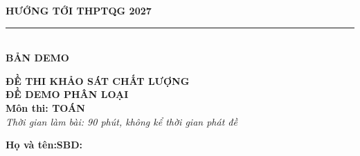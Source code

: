 \documentclass[12pt,a4paper]{article}
\begin{document}
\begin{minipage}[t]{0.40\textwidth}\centering
\textbf{HƯỚNG TỚI THPTQG 2027}\\[-2pt]
\rule{3.2cm}{0.6pt}\\[4pt]\textbf{BẢN DEMO}
\end{minipage}\hfill
\begin{minipage}[t]{0.58\textwidth}\centering
\textbf{ĐỀ THI KHẢO SÁT CHẤT LƯỢNG}\\
\textbf{ĐỀ DEMO PHÂN LOẠI}\\\textbf{Môn thi: TOÁN}\\
\textit{\small Thời gian làm bài: 90 phút, không kể thời gian phát đề}
\end{minipage}
\vspace{0.2cm}
\begin{minipage}[b]{0.78\textwidth}
\textbf{Họ và tên:}\dotfill\textbf{SBD:}\makebox[3.5cm]{\dotfill}
\end{minipage}\hfill
\begin{minipage}[b]{0.20\textwidth}\hfill
{}
\end{minipage}
\vspace{0.2cm}
\end{document}
